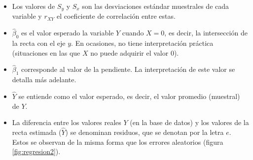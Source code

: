 \documentclass[
  11pt,
]{book}
\providecommand{\tightlist}{%
  \setlength{\itemsep}{0pt}\setlength{\parskip}{0pt}}
\theoremstyle{definition}
\theoremstyle{definition}
\theoremstyle{definition}
\theoremstyle{definition}
\theoremstyle{remark}
\begin{document}
\begin{itemize}
\tightlist
\item
  Los valores de \(S_y\) y \(S_x\) son las desviaciones estándar muestrales de cada variable y \(r_{XY}\) el coeficiente de correlación entre estas.
\item
  \(\widehat{\beta}_0\) es el valor esperado la variable \(Y\) cuando \(X = 0\), es decir, la intersección de la recta con el eje \(y\). En ocasiones, no tiene interpretación práctica (situaciones en las que \(X\) no puede adquirir el valor 0).
\item
  \(\widehat{\beta}_1\) corresponde al valor de la pendiente. La interpretación de este valor se detalla más adelante.
\item
  \(\widehat{Y}\) se entiende como el valor esperado, es decir, el valor promedio (muestral) de \(Y\).
\item
  La diferencia entre los valores reales \(Y\) (en la base de datos) y los valores de la recta estimada (\(\widehat{Y}\)) se denominan residuos, que se denotan por la letra \(e\). Estos se observan de la misma forma que los errores aleatorios (figura \ref{fig:regresion2}).
\end{itemize}
\end{document}
